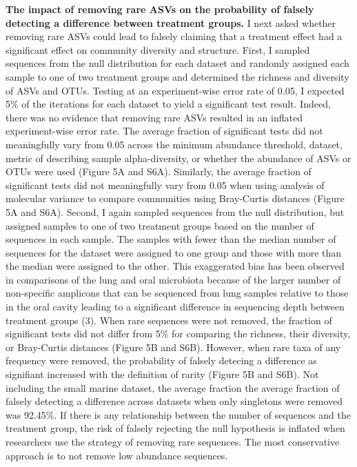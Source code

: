 \documentclass[]{article}
\begin{document}
\textbf{The impact of removing rare ASVs on the probability of falsely
detecting a difference between treatment groups.} I next asked whether
removing rare ASVs could lead to falsely claiming that a treatment
effect had a significant effect on community diversity and structure.
First, I sampled sequences from the null distribution for each dataset
and randomly assigned each sample to one of two treatment groups and
determined the richness and diversity of ASVs and OTUs. Testing at an
experiment-wise error rate of 0.05, I expected 5\% of the iterations for
each dataset to yield a significant test result. Indeed, there was no
evidence that removing rare ASVs resulted in an inflated experiment-wise
error rate. The average fraction of significant tests did not
meaningfully vary from 0.05 across the minimum abundance threshold,
dataset, metric of describing sample alpha-diversity, or whether the
abundance of ASVs or OTUs were used (Figure 5A and S6A). Similarly, the
average fraction of significant tests did not meaningfully vary from
0.05 when using analysis of molecular variance to compare communities
using Bray-Curtis distances (Figure 5A and S6A). Second, I again sampled
sequences from the null distribution, but assigned samples to one of two
treatment groups based on the number of sequences in each sample. The
samples with fewer than the median number of sequences for the dataset
were assigned to one group and those with more than the median were
assigned to the other. This exaggerated bias has been observed in
comparisons of the lung and oral microbiota because of the larger number
of non-specific amplicons that can be sequenced from lung samples
relative to those in the oral cavity leading to a significant difference
in sequencing depth between treatment groups (3). When rare sequences
were not removed, the fraction of significant tests did not differ from
5\% for comparing the richness, their diversity, or Bray-Curtis
distances (Figure 5B and S6B). However, when rare taxa of any frequency
were removed, the probability of falsely detecing a difference as
signifiant increased with the definition of rarity (Figure 5B and S6B).
Not including the small marine dataset, the average fraction the average
fraction of falsely detecting a difference across datasets when only
singletons were removed was 92.45\%. If there is any relationship
between the number of sequences and the treatment group, the risk of
falsely rejecting the null hypothesis is inflated when researchers use
the strategy of removing rare sequences. The most conservative approach
is to not remove low abundance sequences.
\end{document}
